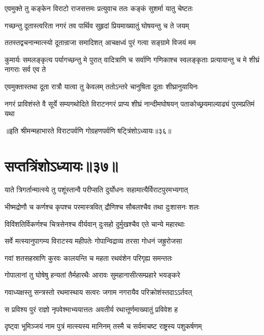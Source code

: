 
\twolineshloka
{एवमुक्ते तु कङ्केन विराटो राजसत्तमः}
{प्रत्युवाच ततः कङ्कं सुशर्मा यातु चेष्टतः}


\twolineshloka
{गच्छन्तु दूतास्त्वरिता नगरं तव पार्थिव}
{सुहृदां प्रियमाख्यातुं घोषयन्तु च ते जयम्}


\twolineshloka
{ततस्तद्वचनान्मात्स्यो दूतान्राजा समादिशत्}
{आचक्षध्वं पुरं गत्वा सङ्ग्रामे विजयं मम}


\threelineshloka
{कुमार्यः समलङ्कृत्य पर्यागच्छन्तु मे पुरात्}
{वादित्राणि च सर्वाणि गणिकाश्च स्वलङ्कृताः}
{प्रत्यायान्तु च मे शीघ्रं नागराः सर्व एव ते}


\twolineshloka
{एवमुक्तास्तथा दूता रात्रौ यात्वा तु केवलम्}
{ततोऽन्तरे चानुषिता दूताः शीघ्रानुयायिनः}


\threelineshloka
{नगरं प्राविशंस्ते वै सूर्ये सम्यगथोदिते}
{विराटनगरं प्राप्य शीघ्रं नान्दीमघोषयन्}
{पताकोच्छ्रयमाल्याढ्यं पुरमप्रतिमं यथा}

॥इति श्रीमन्महाभारते विराटपर्वणि गोग्रहणपर्वणि षट्त्रिंशोऽध्यायः॥३६॥

\chapter{सप्तत्रिंशोऽध्यायः॥३७॥}

\twolineshloka
{याते त्रिगर्तान्मात्स्ये तु पशूंस्तान्वै परीप्सति}
{दुर्योधनः सहामात्यैर्विराटपुरमभ्यगात्}


\twolineshloka
{भीष्मद्रोणौ च कर्णश्च कृपश्च परमास्त्रवित्}
{द्रौणिश्च सौबलश्चैव तथा दुःशासनः शलः}


\twolineshloka
{विविंशतिर्विकर्णश्च चित्रसेनश्च वीर्यवान्}
{दुःसहो दुर्मुखश्चैव एते चान्ये महारथाः}


\twolineshloka
{सर्वे मत्स्यानुपागम्य विराटस्य महीपतेः}
{गोपान्विद्राव्य तरसा गोधनं जह्रुरोजसा}


\twolineshloka
{गवां शतसहस्राणि कुरवः कालयन्ति च}
{महता रथवंशेन परिगृह्य समन्ततः}


\twolineshloka
{गोपालानां तु घोषेषु हन्यतां तैर्महारथैः}
{आरावः सुमहानासीत्सम्प्रहारे भयङ्करे}


\twolineshloka
{गवाध्यक्षस्तु सन्त्रस्तो रथमास्थाय सत्वरः}
{जगाम नगरायैव परिक्रोशंस्तदाऽऽर्तवत्}


\twolineshloka
{स प्रविश्य पुरं राज्ञो नृपवेश्माभ्ययात्ततः}
{अवतीर्य रथात्तूर्णमाख्यातुं प्रविवेश ह}


\twolineshloka
{दृष्ट्वा भूमिञ्जयं नाम पुत्रं मात्स्यस्य मानिनम्}
{तस्मै च सर्वमाचष्ट राष्ट्रस्य पशुकर्षणम्}



